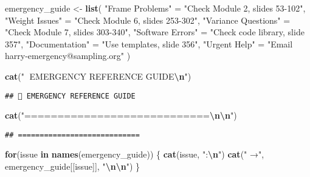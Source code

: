 \documentclass[
]{article}
\newenvironment{Shaded}{\begin{snugshade}}{\end{snugshade}}
\newcommand{\ControlFlowTok}[1]{\textcolor[rgb]{0.13,0.29,0.53}{\textbf{#1}}}
\newcommand{\FunctionTok}[1]{\textcolor[rgb]{0.13,0.29,0.53}{\textbf{#1}}}
\newcommand{\NormalTok}[1]{#1}
\newcommand{\OtherTok}[1]{\textcolor[rgb]{0.56,0.35,0.01}{#1}}
\newcommand{\SpecialCharTok}[1]{\textcolor[rgb]{0.81,0.36,0.00}{\textbf{#1}}}
\newcommand{\StringTok}[1]{\textcolor[rgb]{0.31,0.60,0.02}{#1}}
\begin{document}
\begin{Shaded}
\begin{Highlighting}[]
\NormalTok{emergency\_guide }\OtherTok{\textless{}{-}} \FunctionTok{list}\NormalTok{(}
  \StringTok{"Frame Problems"} \OtherTok{=} \StringTok{"Check Module 2, slides 53{-}102"}\NormalTok{,}
  \StringTok{"Weight Issues"} \OtherTok{=} \StringTok{"Check Module 6, slides 253{-}302"}\NormalTok{,}
  \StringTok{"Variance Questions"} \OtherTok{=} \StringTok{"Check Module 7, slides 303{-}340"}\NormalTok{,}
  \StringTok{"Software Errors"} \OtherTok{=} \StringTok{"Check code library, slide 357"}\NormalTok{,}
  \StringTok{"Documentation"} \OtherTok{=} \StringTok{"Use templates, slide 356"}\NormalTok{,}
  \StringTok{"Urgent Help"} \OtherTok{=} \StringTok{"Email harry{-}emergency@sampling.org"}
\NormalTok{)}

\FunctionTok{cat}\NormalTok{(}\StringTok{"🚨 EMERGENCY REFERENCE GUIDE}\SpecialCharTok{\textbackslash{}n}\StringTok{"}\NormalTok{)}
\end{Highlighting}
\end{Shaded}

\begin{verbatim}
## 🚨 EMERGENCY REFERENCE GUIDE
\end{verbatim}

\begin{Shaded}
\begin{Highlighting}[]
\FunctionTok{cat}\NormalTok{(}\StringTok{"============================}\SpecialCharTok{\textbackslash{}n\textbackslash{}n}\StringTok{"}\NormalTok{)}
\end{Highlighting}
\end{Shaded}

\begin{verbatim}
## ============================
\end{verbatim}

\begin{Shaded}
\begin{Highlighting}[]
\ControlFlowTok{for}\NormalTok{(issue }\ControlFlowTok{in} \FunctionTok{names}\NormalTok{(emergency\_guide)) \{}
  \FunctionTok{cat}\NormalTok{(issue, }\StringTok{":}\SpecialCharTok{\textbackslash{}n}\StringTok{"}\NormalTok{)}
  \FunctionTok{cat}\NormalTok{(}\StringTok{"  →"}\NormalTok{, emergency\_guide[[issue]], }\StringTok{"}\SpecialCharTok{\textbackslash{}n\textbackslash{}n}\StringTok{"}\NormalTok{)}
\NormalTok{\}}
\end{Highlighting}
\end{Shaded}
\end{document}
